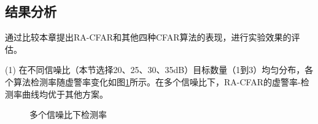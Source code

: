 \subsection{结果分析}
通过比较本章提出RA-CFAR和其他四种CFAR算法的表现，进行实验效果的评估。
\par
(1) 在不同信噪比（本节选择20、25、30、35dB）目标数量（1到3）均匀分布，各个算法检测率随虚警率变化如图\ref{fig:多个SNR检测率}所示。在多个信噪比下，RA-CFAR的虚警率-检测率曲线均优于其他方案。
\begin{figure}[htbp]
	\centering
	\caption{多个信噪比下检测率}
	\label{fig:多个SNR检测率}
\end{figure}

